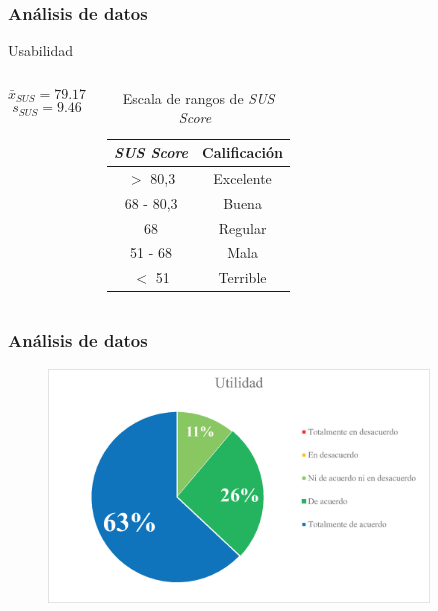 \documentclass[9pt]{beamer}
\begin{document}
    \begin{frame}      
        \frametitle{Análisis de datos}
        Usabilidad
       \begin{columns}
            $$ \bar{x}_{SUS} = 79.17$$
            $$ s_{SUS} = 9.46$$
    
            \begin{table}[H]
                \centering
                \caption[Escala de rangos de \textit{SUS Score}]{Escala de rangos de \textit{SUS Score}~\cite{sus-scale}}
                \bigskip
                \begin{tabular}{||c|c||}
                    \hline
                    \textit{SUS Score} & Calificación\\ [0.5ex] 
                    \hline\hline
                    $>$ 80,3 & Excelente\\
                    \hline
                    68 - 80,3 & Buena\\
                    \hline
                    68 & Regular\\
                    \hline
                    51 - 68 & Mala\\
                    \hline
                    $<$ 51 & Terrible\\
                    \hline
                \end{tabular}
                \label{fig:sus}
            \end{table}
       \end{columns}
    \end{frame}

    \begin{frame}      
        \frametitle{Análisis de datos}
        \begin{figure}
            \centering
            \includegraphics[width=0.9\textwidth]{assets/Evaluacion/utility.eps}
        \end{figure}
    \end{frame}
\end{document}
